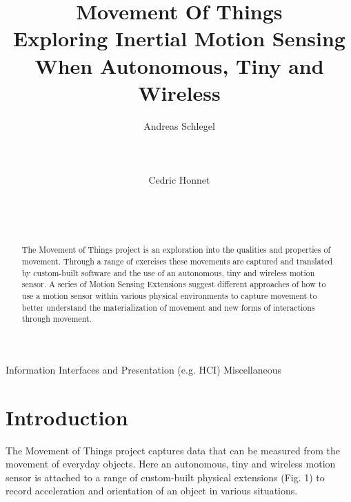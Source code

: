 \documentclass{sigchi}
\begin{document}
\title{Movement Of Things\\
Exploring Inertial Motion Sensing\\
When Autonomous, Tiny and Wireless}

\author{
  \alignauthor Andreas Schlegel\\
    \\
    \\
    \\
  \alignauthor Cedric Honnet\\
    \\
    \\
    \\
}

\maketitle

\begin{abstract}
The Movement of Things project is an exploration into
the qualities and properties of movement. Through a
range of exercises these movements are captured and
translated by custom-built software and the use of an
autonomous, tiny and wireless motion sensor. A series
of Motion Sensing Extensions suggest different
approaches of how to use a motion sensor within
various physical environments to capture movement to
better understand the materialization of movement and
new forms of interactions through movement.
\end{abstract}


{Information Interfaces and Presentation (e.g. HCI)}
{Miscellaneous}

\section{Introduction}

The Movement of Things project captures data that can
be measured from the movement of everyday objects.
Here an autonomous, tiny and wireless motion sensor
is attached to a range of custom-built physical
extensions (Fig. 1) to record acceleration and orientation of an
object in various situations.
\end{document}
